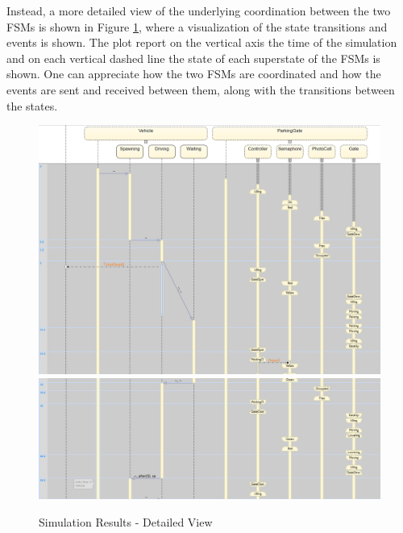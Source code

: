 Instead, a more detailed view of the underlying coordination between the two FSMs is shown in Figure \ref{fig:simulation_results_detailed}, where a visualization of the state transitions and events is shown.
The plot report on the vertical axis the time of the simulation and on each vertical dashed line the state of each superstate of the FSMs is shown.
One can appreciate how the two FSMs are coordinated and how the events are sent and received between them, along with the transitions between the states.

\begin{figure}[H]
    \centering
    \includegraphics[width=1.0\textwidth]{./img/events_part_1.png}
    \includegraphics[width=1.0\textwidth]{./img/events_part_2.png}
    \caption{Simulation Results - Detailed View}
    \label{fig:simulation_results_detailed}
\end{figure}










